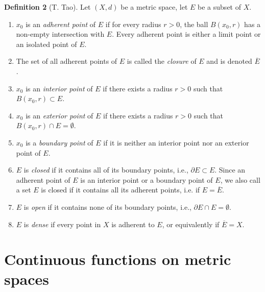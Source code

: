 \documentclass{book}
\newcommand{\titl}[1]{\noindent\textbf{#1}}
\begin{document}
\begin{framed}
\titl{Definition 2} (T. Tao). Let $(X,d)$ be a metric space, let $E$ be a subset of $X$.
\begin{enumerate}
    \item $x_0$ is an \emph{adherent point} of $E$ if for every radius $r>0$, the ball $B(x_0,r)$ has a non-empty intersection with $E$. Every adherent point is either a limit point or an isolated point of $E$.
    \item The set of all adherent points of $E$ is called the \emph{closure} of $E$ and is denoted $\overline E$.
    \item $x_0$ is an \emph{interior point} of $E$ if there exists a radius $r>0$ such that $B(x_0,r)\subset E$.
    \item $x_0$ is an \emph{exterior point} of $E$ if there exists a radius $r>0$ such that $B(x_0,r)\cap E=\emptyset$.
    \item $x_0$ is a \emph{boundary point} of $E$ if it is neither an interior point nor an exterior point of $E$.
    \item $E$ is \emph{closed} if it contains all of its boundary points, i.e., $\partial E\subset E$. Since an adherent point of $E$ is an interior point or a boundary point of $E$, we also call a set $E$ is closed if it contains all its adherent points, i.e. if $E = \overline{E}$.
    \item $E$ is \emph{open} if it contains none of its boundary points, i.e., $\partial E\cap E=\emptyset$.
    \item $E$ is \emph{dense} if every point in $X$ is adherent to $E$, or equivalently if $\overline E=X$.
\end{enumerate}
\end{framed}

\chapter{Continuous functions on metric spaces}
\end{document}
